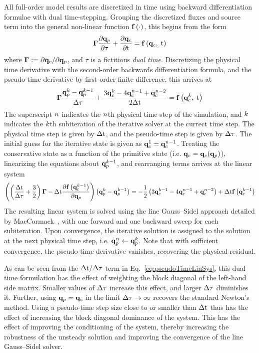 All full-order model results are discretized in time using backward differentiation formulae with dual time-stepping. Grouping the discretized fluxes and source term into the general non-linear function $\mathbf{f} \left(\cdot\right)$, this begins from the form
%
\begin{equation}
	\boldsymbol{\Gamma} \frac{\partial \mathbf{q}_p}{\partial \tau} + \frac{\partial \mathbf{q}_c}{\partial \text{t}} = \mathbf{f} \left(\mathbf{q}_c, \; \text{t}\right)
\end{equation}
%
where $\boldsymbol{\Gamma} := \partial \mathbf{q}_c / \partial \mathbf{q}_p$, and $\tau$ is a fictitious \textit{dual time}. Discretizing the physical time derivative with the second-order backwards differentiation formula, and the pseudo-time derivative by first-order finite-difference, this arrives at
%
\begin{equation}
	\boldsymbol{\Gamma} \frac{\mathbf{q}_p^{k} - \mathbf{q}_p^{k - 1}}{\Delta \tau} + \frac{3 \mathbf{q}_c^{k} - 4 \mathbf{q}_c^{n - 1} + \mathbf{q}_c^{n - 2}}{2\Delta \text{t}} = \mathbf{f} \left(\mathbf{q}_c^{k}, \; \text{t}\right)
\end{equation}
%
The superscript $n$ indicates the $n$th physical time step of the simulation, and $k$ indicates the $k$th subiteration of the iterative solver at the currect time step. The physical time step is given by $\Delta \text{t}$, and the pseudo-time step is given by $\Delta \tau$. The initial guess for the iterative state is given as $\mathbf{q}_c^1 = \mathbf{q}_c^{n - 1}$. Treating the conservative state as a function of the primitive state (i.e. $\mathbf{q}_c = \mathbf{q}_c(\mathbf{q}_p)$), linearizing the equations about $\mathbf{q}_p^{k - 1}$, and rearranging terms arrives at the linear system
%
\begin{equation}\label{eq:pseudoTimeLinSys}
\left(\left(\frac{\Delta \text{t}}{\Delta \tau} + \frac{3}{2}\right)\boldsymbol{\Gamma} - \Delta \text{t} \frac{\partial \mathbf{f} \left(\mathbf{q}_c^{k - 1}\right)}{\partial \mathbf{q}_p}\right) \left(\mathbf{q}_p^{k} - \mathbf{q}_p^{k - 1}\right) = - \frac{1}{2}\left(3 \mathbf{q}_c^{k-1} - 4 \mathbf{q}_c^{n - 1} + \mathbf{q}_c^{n - 2}\right) + \Delta \text{t} \mathbf{f} \left(\mathbf{q}_c^{k - 1}\right)
\end{equation}
%
The resulting linear system is solved using the line Gauss--Sidel approach detailed by MacCormack~\cite{MacCormack1985}, with one forward and one backward sweep for each subiteration. Upon convergence, the iterative solution is assigned to the solution at the next physical time step, i.e. $\mathbf{q}_p^{n} \leftarrow \mathbf{q}_p^{k}$. Note that with sufficient convergence, the pseudo-time derivative vanishes, recovering the physical residual.

As can be seen from the $\Delta \text{t}/\Delta \tau$ term in Eq.~\ref{eq:pseudoTimeLinSys}, this dual-time formulation has the effect of weighting the block diagonal of the left-hand side matrix. Smaller values of $\Delta \tau$ increase this effect, and larger $\Delta \tau$ diminishes it. Further, using $\mathbf{q}_p = \mathbf{q}_c$ in the limit $\Delta \tau \rightarrow \infty$ recovers the standard Newton's method. Using a pseudo-time step size close to or smaller than $\Delta \text{t}$ thus has the effect of increasing the block diagonal dominance of the system. This has the effect of improving the conditioning of the system, thereby increasing the robustness of the unsteady solution and improving the convergence of the line Gauss--Sidel solver.